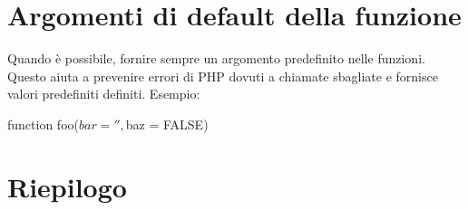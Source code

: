 \section*{Argomenti di default della funzione}
Quando è possibile, fornire sempre un argomento predefinito nelle funzioni. Questo aiuta a prevenire errori di \ac{PHP} dovuti a chiamate sbagliate e fornisce valori predefiniti definiti. Esempio:

\begin{code}
function foo($bar = '', $baz = FALSE)
\end{code}

\section*{Riepilogo}
\omissis